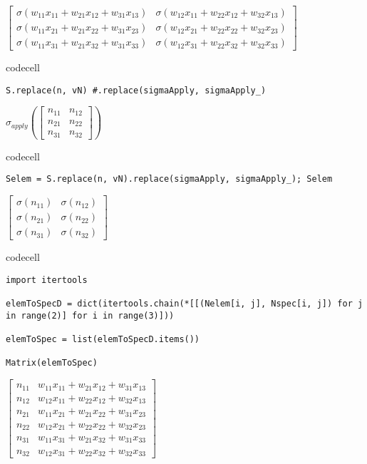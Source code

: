 $\displaystyle \left[\begin{matrix}\sigma{\left(w_{11} x_{11} + w_{21} x_{12} + w_{31} x_{13} \right)} & \sigma{\left(w_{12} x_{11} + w_{22} x_{12} + w_{32} x_{13} \right)}\\\sigma{\left(w_{11} x_{21} + w_{21} x_{22} + w_{31} x_{23} \right)} & \sigma{\left(w_{12} x_{21} + w_{22} x_{22} + w_{32} x_{23} \right)}\\\sigma{\left(w_{11} x_{31} + w_{21} x_{32} + w_{31} x_{33} \right)} & \sigma{\left(w_{12} x_{31} + w_{22} x_{32} + w_{32} x_{33} \right)}\end{matrix}\right]$

codecell

\begin{verbatim}
S.replace(n, vN) #.replace(sigmaApply, sigmaApply_)
\end{verbatim}

$\displaystyle \sigma_{apply}{\left(\left[\begin{matrix}n_{11} & n_{12}\\n_{21} & n_{22}\\n_{31} & n_{32}\end{matrix}\right] \right)}$

codecell

\begin{verbatim}
Selem = S.replace(n, vN).replace(sigmaApply, sigmaApply_); Selem
\end{verbatim}

$\displaystyle \left[\begin{matrix}\sigma{\left(n_{11} \right)} & \sigma{\left(n_{12} \right)}\\\sigma{\left(n_{21} \right)} & \sigma{\left(n_{22} \right)}\\\sigma{\left(n_{31} \right)} & \sigma{\left(n_{32} \right)}\end{matrix}\right]$

codecell

\begin{verbatim}
import itertools

elemToSpecD = dict(itertools.chain(*[[(Nelem[i, j], Nspec[i, j]) for j in range(2)] for i in range(3)]))

elemToSpec = list(elemToSpecD.items())

Matrix(elemToSpec)
\end{verbatim}

$\displaystyle \left[\begin{matrix}n_{11} & w_{11} x_{11} + w_{21} x_{12} + w_{31} x_{13}\\n_{12} & w_{12} x_{11} + w_{22} x_{12} + w_{32} x_{13}\\n_{21} & w_{11} x_{21} + w_{21} x_{22} + w_{31} x_{23}\\n_{22} & w_{12} x_{21} + w_{22} x_{22} + w_{32} x_{23}\\n_{31} & w_{11} x_{31} + w_{21} x_{32} + w_{31} x_{33}\\n_{32} & w_{12} x_{31} + w_{22} x_{32} + w_{32} x_{33}\end{matrix}\right]$


